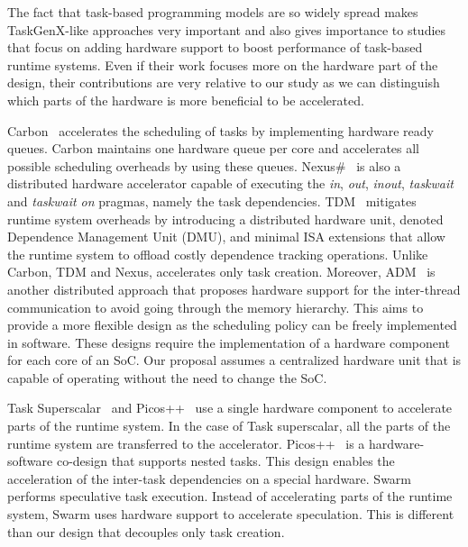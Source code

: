 The fact that task-based programming models are so widely spread makes TaskGenX-like approaches very important and also gives importance to studies that focus on adding hardware support to boost performance of task-based runtime systems.
Even if their work focuses more on the hardware part of the design, their contributions are very relative to our study as we can distinguish which parts of the hardware is more beneficial to be accelerated.

Carbon~\cite{Carbon} accelerates the scheduling of tasks by implementing hardware ready queues.
Carbon maintains one hardware queue per core and accelerates all possible scheduling overheads by using these queues.
Nexus\#~\cite{Nexus} is also a distributed hardware accelerator capable of executing the \textit{in}, \textit{out}, \textit{inout}, \textit{taskwait} and \textit{taskwait on} pragmas, namely the task dependencies.
TDM~\cite{Emilio:HPCA} mitigates runtime system overheads by introducing a distributed hardware unit, denoted Dependence Management Unit (DMU), and minimal ISA extensions that allow the runtime system to offload costly dependence tracking operations.
Unlike Carbon, TDM and Nexus, {\proposal} accelerates only task creation.
Moreover, ADM~\cite{Sanchez:2010} is another distributed approach that proposes hardware support for the inter-thread communication to avoid going through the memory hierarchy. 
This aims to provide a more flexible design as the scheduling policy can be freely implemented in software.
These designs require the implementation of a hardware component for each core of an SoC.
Our proposal assumes a centralized hardware unit that is capable of operating without the need to change the SoC.

Task Superscalar~\cite{TaskSS} and Picos++~\cite{Xubin} use a single hardware component to accelerate parts of the runtime system.
In the case of Task superscalar, all the parts of the runtime system are transferred to the accelerator.
Picos++~\cite{Xubin} is a hardware-software co-design that supports nested tasks. 
This design enables the acceleration of the inter-task dependencies on a special hardware.
Swarm~\cite{Swarm} performs speculative task execution. 
Instead of accelerating parts of the runtime system, Swarm uses hardware support to accelerate speculation.
This is different than our design that decouples only task creation.

